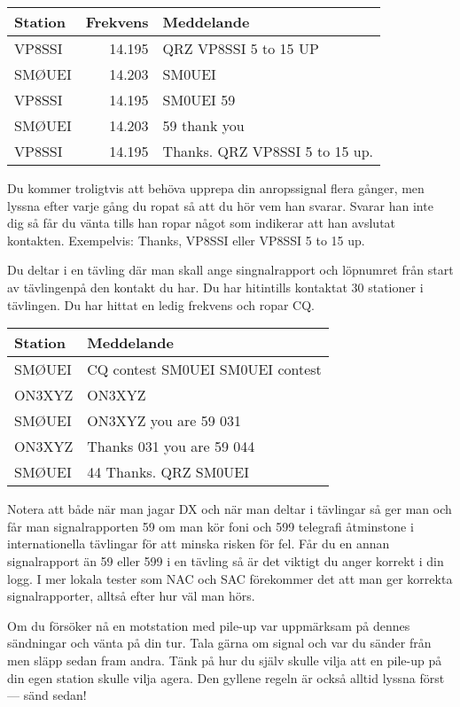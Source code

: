 \begin{tabular}{lrl}
	Station & Frekvens & Meddelande                     \\ \hline
	VP8SSI  &   14.195 & QRZ VP8SSI  5 to 15 UP         \\
	SMØUEI  &   14.203 & SM0UEI                         \\
	VP8SSI  &   14.195 & SM0UEI 59                      \\
	SMØUEI  &   14.203 & 59 thank you                   \\
	VP8SSI  &   14.195 & Thanks. QRZ VP8SSI 5 to 15 up.
\end{tabular}

Du kommer troligtvis att behöva upprepa din anropssignal flera gånger, men
lyssna efter varje gång du ropat så att du hör vem han svarar. Svarar han inte
dig så får du vänta tills han ropar något som indikerar att han avslutat
kontakten. Exempelvis: Thanks, VP8SSI eller VP8SSI 5 to 15 up.

Du deltar i en tävling där man skall ange singnalrapport och löpnumret från
start av tävlingenpå den kontakt du har. Du har hitintills kontaktat 30
stationer i tävlingen. Du har hittat en ledig frekvens och ropar CQ.

\begin{tabular}{ll}
	Station & Meddelande                       \\ \hline
	SMØUEI  & CQ contest SM0UEI SM0UEI contest \\
	ON3XYZ  & ON3XYZ                           \\
	SMØUEI  & ON3XYZ you are 59 031            \\
	ON3XYZ  & Thanks 031 you are 59 044        \\
	SMØUEI  & 44 Thanks. QRZ SM0UEI
\end{tabular}

Notera att både när man jagar DX och när man deltar i tävlingar så ger man och
får man signalrapporten 59 om man kör foni och 599 telegrafi åtminstone i
internationella tävlingar för att minska risken för fel. Får du en annan
signalrapport än 59 eller 599 i en tävling så är det viktigt du anger korrekt i
din logg. I mer lokala tester som NAC och SAC förekommer det att man ger
korrekta signalrapporter, alltså efter hur väl man hörs.

Om du försöker nå en motstation med pile-up var uppmärksam på dennes sändningar
och vänta på din tur. Tala gärna om signal och var du sänder från men släpp
sedan fram andra. Tänk på hur du själv skulle vilja att en pile-up på din egen
station skulle vilja agera. Den gyllene regeln är också alltid lyssna först ---
sänd sedan!

\clearpage



